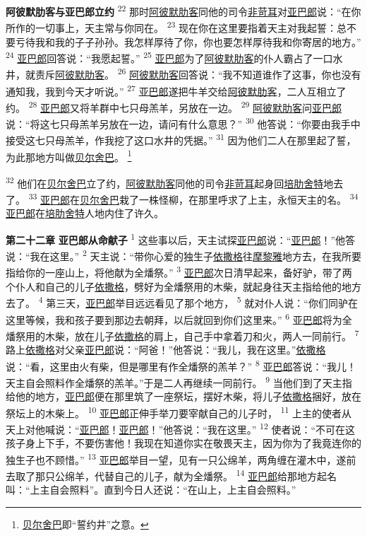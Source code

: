 \textbf{阿彼默肋客与亚巴郎立约 }
\textsuperscript{22}
那时\uline{阿彼默}\uline{肋客}同他的司令\uline{非苛耳}对\uline{亚巴郎}说：“在你所作的一切事上，天主常与你同在。
\textsuperscript{23}
现在你在这里要指着天主对我起誓：总不要亏待我和我的子子孙孙。我怎样厚待了你，你也要怎样厚待我和你寄居的地方。”
\textsuperscript{24}
\uline{亚巴郎}回答说：“我愿起誓。”
\textsuperscript{25}
\uline{亚巴郎}为了\uline{阿彼默}\uline{肋客}的仆人霸占了一口水井，就责斥\uline{阿彼默}\uline{肋客}。
\textsuperscript{26}
\uline{阿彼默}\uline{肋客}回答说：“我不知道谁作了这事，你也没有通知我，我到今天才听说。”
\textsuperscript{27}
\uline{亚巴郎}遂把牛羊交给\uline{阿彼默}\uline{肋客}，二人互相立了约。
\textsuperscript{28}
\uline{亚巴郎}又将羊群中七只母羔羊，另放在一边。
\textsuperscript{29}
\uline{阿彼默}\uline{肋客}问\uline{亚巴郎}说：“将这七只母羔羊另放在一边，请问有什么意思？”
\textsuperscript{30}
他答说：“你要由我手中接受这七只母羔羊，作我挖了这口水井的凭据。”
\textsuperscript{31}
因为他们二人在那里起了誓，为此那地方叫做\uline{贝尔}\uline{舍巴}。
\footnote{\uline{贝尔}\uline{舍巴}即“誓约井”之意。}

\textsuperscript{32}
他们在\uline{贝尔}\uline{舍巴}立了约，\uline{阿彼默}\uline{肋客}同他的司令\uline{非苛耳}起身回\uline{培肋}\uline{舍特}地去了。
\textsuperscript{33}
\uline{亚巴郎}在\uline{贝尔}\uline{舍巴}栽了一株怪柳，在那里呼求了上主，永恒天主的名。
\textsuperscript{34}
\uline{亚巴郎}在\uline{培肋}\uline{舍特}人地内住了许久。

\textbf{第二十二章 }
\textbf{亚巴郎从命献子 }
\textsuperscript{1}
这些事以后，天主试探\uline{亚巴郎}说：“\uline{亚巴郎}！”他答说：“我在这里。”
\textsuperscript{2}
天主说：“带你心爱的独生子\uline{依撒格}往\uline{摩黎雅}地方去，在我所要指给你的一座山上，将他献为全燔祭。”
\textsuperscript{3}
\uline{亚巴郎}次日清早起来，备好驴，带了两个仆人和自己的儿子\uline{依撒格}，劈好为全燔祭用的木柴，就起身往天主指给他的地方去了。
\textsuperscript{4}
第三天，\uline{亚巴郎}举目远远看见了那个地方，
\textsuperscript{5}
就对仆人说：“你们同驴在这里等候，我和孩子要到那边去朝拜，以后就回到你们这里来。”
\textsuperscript{6}
\uline{亚巴郎}将为全燔祭用的木柴，放在儿子\uline{依撒格}的肩上，自己手中拿着刀和火，两人一同前行。
\textsuperscript{7}
路上\uline{依撒格}对父亲\uline{亚巴郎}说：“阿爸！”他答说：“我儿，我在这里。”\uline{依撒格}说：“看，这里由火有柴，但是哪里有作全燔祭的羔羊？”
\textsuperscript{8}
\uline{亚巴郎}答说：“我儿！天主自会照料作全燔祭的羔羊。”于是二人再继续一同前行。
\textsuperscript{9}
当他们到了天主指给他的地方，\uline{亚巴郎}便在那里筑了一座祭坛，摆好木柴，将儿子\uline{依撒格}捆好，放在祭坛上的木柴上。
\textsuperscript{10}
\uline{亚巴郎}正伸手举刀要宰献自己的儿子时，
\textsuperscript{11}
上主的使者从天上对他喊说：“\uline{亚巴郎}！\uline{亚巴郎}！”他答说：“我在这里。”
\textsuperscript{12}
使者说：“不可在这孩子身上下手，不要伤害他！我现在知道你实在敬畏天主，因为你为了我竟连你的独生子也不顾惜。”
\textsuperscript{13}
\uline{亚巴郎}举目一望，见有一只公绵羊，两角缠在灌木中，遂前去取了那只公绵羊，代替自己的儿子，献为全燔祭。
\textsuperscript{14}
\uline{亚巴郎}给那地方起名叫：“上主自会照料”。直到今日人还说：“在山上，上主自会照料。”

